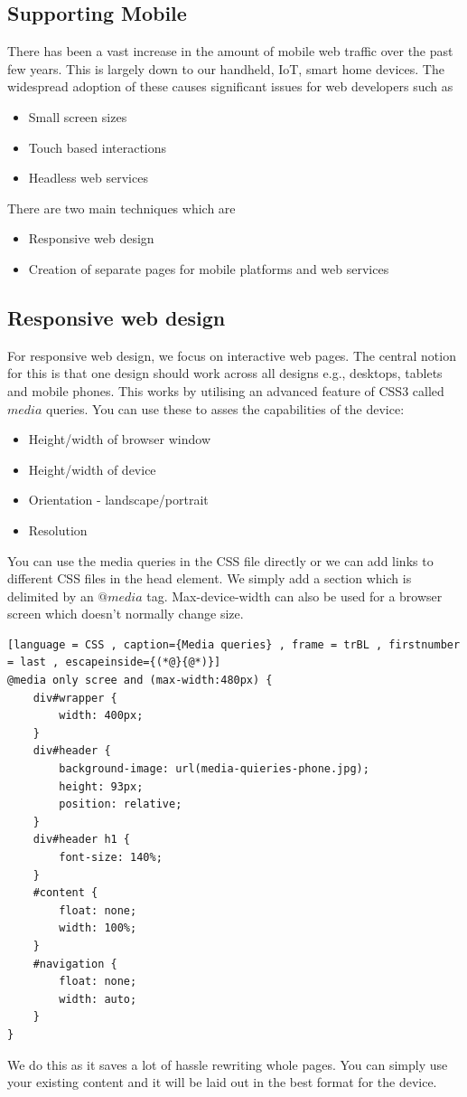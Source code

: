\documentclass[a4paper]{article}
\theoremstyle{plain}
\theoremstyle{definition}
\theoremstyle{remark}
\begin{document}
\begin{flushleft}
\section{Supporting Mobile}
There has been a vast increase in the amount of mobile web traffic over the past few years. This is largely down to our handheld, IoT, smart home devices. The widespread adoption of these causes significant issues for web developers such as
\begin{itemize}
	\item Small screen sizes
	\item Touch based interactions
	\item Headless web services
\end{itemize}
There are two main techniques which are
\begin{itemize}
	\item Responsive web design
	\item Creation of separate pages for mobile platforms and web services
\end{itemize}
\subsection{Responsive web design}
For responsive web design, we focus on interactive web pages. The central notion for this is that one design should work across all designs e.g., desktops, tablets and mobile phones. This works by utilising an advanced feature of CSS3 called $media$ queries. You can use these to asses the capabilities of the device:
\begin{itemize}
	\item Height/width of browser window
	\item Height/width of device
	\item Orientation - landscape/portrait
	\item Resolution
\end{itemize}
You can use the media queries in the CSS file directly or we can add links to different CSS files in the head element. We simply add a section which is delimited by an $@media$ tag. Max-device-width can also be used for a browser screen which doesn't normally change size.
\begin{lstlisting}[language = CSS , caption={Media queries} , frame = trBL , firstnumber = last , escapeinside={(*@}{@*)}]
@media only scree and (max-width:480px) {
	div#wrapper {
		width: 400px;
	}
	div#header {
		background-image: url(media-quieries-phone.jpg);
		height: 93px;
		position: relative;
	}
	div#header h1 {
		font-size: 140%;
	}
	#content {
		float: none;
		width: 100%;
	}
	#navigation {
		float: none;
		width: auto;
	}
}
\end{lstlisting}
We do this as it saves a lot of hassle rewriting whole pages. You can simply use your existing content and it will be laid out in the best format for the device. 

\end{flushleft}
\end{document}
